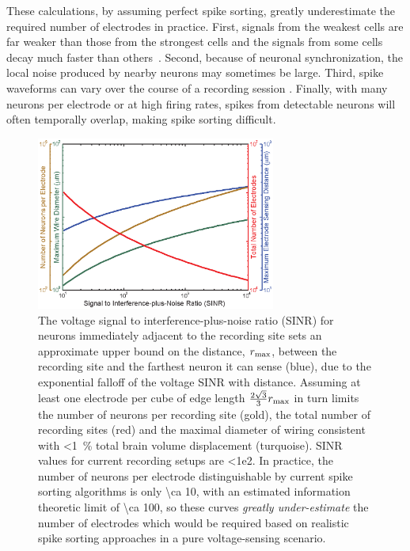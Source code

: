 These calculations, by assuming perfect spike sorting, greatly underestimate the required number of electrodes in practice.
First, signals from the weakest cells are far weaker than those from the strongest cells and the signals from some cells decay much faster than others~\cite{gray95}.
Second, because of neuronal synchronization, the local noise produced by nearby neurons may sometimes be large.
Third, spike waveforms can vary over the course of a recording session \cite{fee1996variability, stratton2012action}.
Finally, with many neurons per electrode or at high firing rates, spikes from detectable neurons will often temporally overlap, making spike sorting difficult.

\begin{figure}[htbp]
\caption{
The voltage signal to interference-plus-noise ratio (SINR) for neurons immediately adjacent to the recording site sets an approximate upper bound on the distance, $r_{\text{\scriptsize max}}$, between the recording site and the farthest neuron it can sense (blue), due to the exponential falloff of the voltage SINR with distance.
Assuming at least one electrode per cube of edge length $\frac{2\sqrt{3}}{3}r_{\text{\scriptsize max}}$ in turn limits the number of neurons per recording site (gold), the total number of recording sites (red) and the maximal diameter of wiring consistent with \SI{<1}{\percent} total brain volume displacement (turquoise).
SINR values for current recording setups are \num{<1e2}.
In practice, the number of neurons per electrode distinguishable by current spike sorting algorithms is only \num{\ca 10}, with an estimated information theoretic limit of \num{\ca 100}, so these curves \emph{greatly under-estimate} the number of electrodes which would be required based on realistic spike sorting approaches in a pure voltage-sensing scenario.
}
\label{fig:snrlimits}
\centering
\includegraphics[width=0.7\textwidth]{figs/Fig3.eps}
\end{figure}


